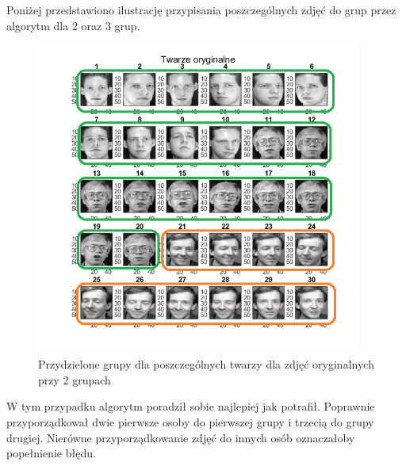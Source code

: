 \documentclass[11pt, a4paper]{article}
\newcommand{\fbi}{\leavevmode{\parindent=1em\indent}}
\begin{document}
\fbi
Poniżej przedstawiono ilustrację przypisania poszczególnych zdjęć do grup przez algorytm dla 2 oraz 3 grup.

\begin{figure}[H]
	\centering
	\includegraphics[width=0.95\textwidth]{./assets/ilustracja_zad2_dane_pogrupowane_2.png}
	\caption{Przydzielone grupy dla poszczególnych twarzy dla zdjęć oryginalnych przy 2 grupach}
	\label{fig:ilustracja_zad2_dane_pogrupowane_2}
\end{figure}

\fbi
W tym przypadku algorytm poradził sobie najlepiej jak potrafił. Poprawnie przyporządkował dwie pierwsze osoby do pierwszej grupy i trzecią do grupy drugiej. Nierówne przyporządkowanie zdjęć do innych osób oznaczałoby popełnienie błędu.
\end{document}
